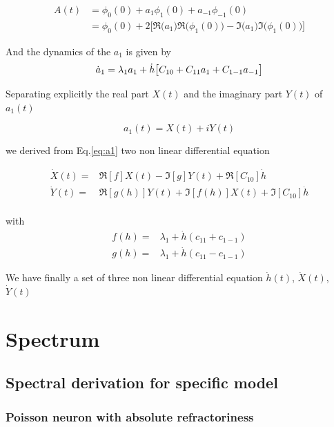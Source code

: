\documentclass[a4paper,11pt,twoside]{article}
\numberwithin{equation}{section}
\begin{document}
\begin{align}
\label{eq:A3}
A(t)&=\phi_0(0) + a_1\phi_1(0) +a_{-1}\phi_{-1}(0) \nonumber \\
      &=\phi_0(0) + 2\big[\Re\big(a_1\big)\Re\big(\phi_1(0)\big)- \Im\big(a_1\big)\Im\big(\phi_1(0)\big)\big] 
\end{align}


And the dynamics of the $a_1$ is given by
\begin{equation}
\label{eq:a1}
\dot{a}_1=\lambda_1 a_1 + \dot{h}\big[C_{10}+C_{11}a_1+C_{1-1}a_{-1}\big] \nonumber \\
\end{equation}

Separating explicitly the real part $X(t)$ and the imaginary part  $Y(t)$ of $a_1(t)$

 \begin{equation}
 \label{eq:a1xy}
 a_1(t)= X(t) +i Y(t)
 \end{equation}
 
 we derived from Eq.\eqref{eq:a1}  two non linear differential equation

\begin{align}
\dot{X}(t)=&\Re[f]X(t)-\Im[g]Y(t) +\Re[C_{10}]\dot{h}\\
\dot{Y}(t)=&\Re[g(h)]Y(t)+\Im[f(h)]X(t) +\Im[C_{10}]\dot{h}\\
\end{align}

with
\begin{align}
f(h)=&\lambda_1+ \dot{h}(c_{11}+c_{1-1})\\
g(h)=&\lambda_1+ \dot{h}(c_{11}-c_{1-1})
\end{align}

We have finally a set of three non linear differential equation $\dot{h}(t)$, $\dot{X}(t)$, $\dot{Y}(t)$

\FloatBarrier
\chapter{Spectrum}
\section{Spectral derivation for specific model}
\label{sec:specif-model}


\subsection{Poisson neuron with absolute refractoriness}
\label{subsec:absref}
\end{document}
